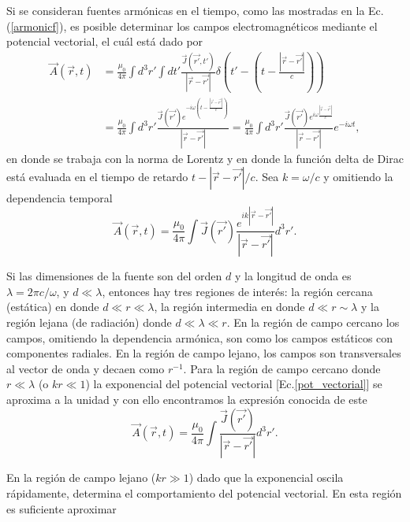 Si se consideran fuentes armónicas en el tiempo, como las mostradas en la Ec.(\ref{armonicf}), es posible determinar los campos electromagnéticos mediante el potencial vectorial, el cuál está dado por \cite{Jackson}
\begin{align*}
  \Vec{A}(\Vec{r},t)&=\frac{\mu_0}{4\pi}\int d^3r'\int dt'\frac{\Vec{J}(\Vec{r'},t')}{|\Vec{r}-\Vec{r'}|}\delta\left(t'-\left(t-\frac{|\Vec{r}-\Vec{r'}|}{c}\right)\right)\nonumber\\
  &=\frac{\mu_0}{4\pi}\int d^3r'\frac{\Vec{J}(\Vec{r'})e^{-i\omega \left(t-\frac{|\Vec{r}-\Vec{r'}|}{c}\right)}}{|\Vec{r}-\Vec{r'}|}=\frac{\mu_0}{4\pi}\int d^3r'\frac{\Vec{J}(\Vec{r'})e^{i\omega \frac{|\Vec{r}-\Vec{r'}|}{c}}}{|\Vec{r}-\Vec{r'}|}e^{-i\omega t},
\end{align*}
en donde se trabaja con la norma de Lorentz \cite{Griffiths} y en donde la función delta de Dirac está evaluada en el tiempo de retardo $t-|\Vec{r}-\Vec{r'}|/c$. Sea $k=\omega/c$ y omitiendo la dependencia temporal
\begin{equation}
    \Vec{A}(\Vec{r},t)=\frac{\mu_0}{4\pi}\int \Vec{J}(\Vec{r'})\frac{e^{ik|\Vec{r}-\Vec{r'}|}}{|\Vec{r}-\Vec{r'}|} d^3r'.
    \label{pot_vectorial}
\end{equation} 




Si las dimensiones de la fuente son del orden $d$ y la longitud de onda es $\lambda=2\pi c/\omega$, y $d\ll\lambda$, entonces hay tres regiones de interés: la región cercana (estática) en donde $d\ll r\ll\lambda$, la región intermedia en donde $d\ll r\sim \lambda$ y la región lejana (de radiación) donde $d\ll \lambda\ll r$.
En la región de campo cercano los campos, omitiendo la dependencia armónica, son como los campos estáticos con componentes radiales. En la región de campo lejano, los campos son transversales al vector de onda y decaen como $r^{-1}$. 
Para la región de campo cercano donde $r\ll\lambda$ (o $kr\ll 1$) la exponencial del potencial vectorial [Ec.\ref{pot_vectorial}] se aproxima a la unidad y con ello encontramos la expresión conocida de este \cite{Jackson}
\begin{equation*}
	\Vec{A}(\Vec{r},t)=\frac{\mu_0}{4\pi}\int \frac{\Vec{J}(\Vec{r'})}{|\Vec{r}-\Vec{r'}|} d^3r'.
\end{equation*} 


En la región de campo lejano ($kr\gg 1$) dado que la exponencial oscila rápidamente, determina el comportamiento del potencial vectorial. En esta región es suficiente aproximar

